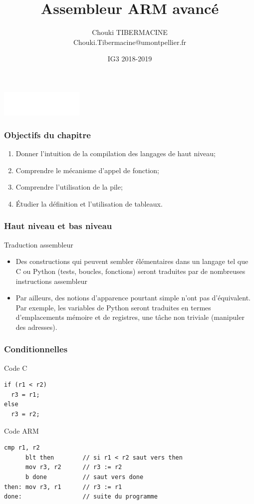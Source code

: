 \documentclass{beamer}
\title[Assembleur ARM avancé]{Assembleur ARM avancé}
\author[C.~Tibermacine]{\large{Chouki TIBERMACINE}\\
\vspace{1cm}
\small{Chouki.Tibermacine@umontpellier.fr}}
\institute{Polytech Montpellier}
\date{\tiny{IG3 2018-2019}}
\begin{document}
\begin{frame}
\titlepage
\begin{center}
\includegraphics[width=4cm]{figs/polytech.png}
\end{center}
\end{frame}

\begin{frame}
\frametitle{Objectifs du chapitre}

\begin{enumerate}
\item Donner l'intuition de la compilation des langages de haut
  niveau;
\item Comprendre le mécanisme d'appel de fonction;
\item Comprendre l'utilisation de la pile;
\item Étudier la définition et l'utilisation de tableaux.
\end{enumerate}
\end{frame}

\begin{frame}
\frametitle{Haut niveau et bas niveau}

\begin{block}{Traduction assembleur}
\begin{itemize}
\item Des constructions qui peuvent sembler élémentaires dans un
  langage tel que C ou Python (tests, boucles, fonctions) seront
  traduites par de nombreuses instructions assembleur

\item Par ailleurs, des notions d'apparence pourtant simple n'ont pas
  d'équivalent. Par exemple, les variables de Python seront traduites
  en termes d'emplacements mémoire et de registres, une tâche non
  triviale (manipuler des adresses).
\end{itemize}
\end{block}
\end{frame}

\begin{frame}[fragile]
\frametitle{Conditionnelles}

\begin{block}{Code C}
{\small
\begin{lstlisting}[style=C]
if (r1 < r2)
  r3 = r1;
else
  r3 = r2;
\end{lstlisting}}
\end{block}

\begin{block}{Code ARM}
{\small
\begin{lstlisting}[style=arm]
      cmp r1, r2
      blt then        // si r1 < r2 saut vers then
      mov r3, r2      // r3 := r2
      b done          // saut vers done
then: mov r3, r1      // r3 := r1
done:                 // suite du programme
\end{lstlisting}}
\end{block}
\end{frame}
\end{document}
